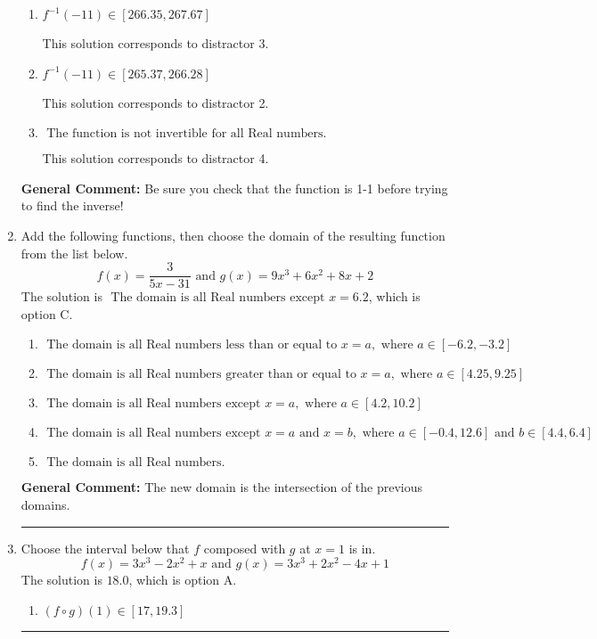 \documentclass{extbook}[14pt]
\newcommand{\litem}[1]{\item #1

\rule{\textwidth}{0.4pt}}
\begin{document}
\begin{enumerate}
{\begin{enumerate}[label=\Alph*.]
* This is the correct solution.
\item \( f^{-1}(-11) \in [266.35, 267.67] \)

 This solution corresponds to distractor 3.
\item \( f^{-1}(-11) \in [265.37, 266.28] \)

 This solution corresponds to distractor 2.
\item \( \text{ The function is not invertible for all Real numbers. } \)

 This solution corresponds to distractor 4.
\end{enumerate}

\textbf{General Comment:} Be sure you check that the function is 1-1 before trying to find the inverse!
}
\litem{
Add the following functions, then choose the domain of the resulting function from the list below.
\[ f(x) = \frac{3}{5x-31} \text{ and } g(x) = 9x^{3} +6 x^{2} +8 x + 2 \]
The solution is \( \text{ The domain is all Real numbers except } x = 6.2 \), which is option C.\begin{enumerate}[label=\Alph*.]
\item \( \text{ The domain is all Real numbers less than or equal to } x = a, \text{ where } a \in [-6.2, -3.2] \)


\item \( \text{ The domain is all Real numbers greater than or equal to } x = a, \text{ where } a \in [4.25, 9.25] \)


\item \( \text{ The domain is all Real numbers except } x = a, \text{ where } a \in [4.2, 10.2] \)


\item \( \text{ The domain is all Real numbers except } x = a \text{ and } x = b, \text{ where } a \in [-0.4, 12.6] \text{ and } b \in [4.4, 6.4] \)


\item \( \text{ The domain is all Real numbers. } \)


\end{enumerate}

\textbf{General Comment:} The new domain is the intersection of the previous domains.
}
\litem{
Choose the interval below that $f$ composed with $g$ at $x=1$ is in.
\[ f(x) = 3x^{3} -2 x^{2} +x \text{ and } g(x) = 3x^{3} +2 x^{2} -4 x + 1 \]
The solution is \( 18.0 \), which is option A.\begin{enumerate}[label=\Alph*.]
\item \( (f \circ g)(1) \in [17, 19.3] \)


\end{enumerate}}
\end{enumerate}
\end{document}
